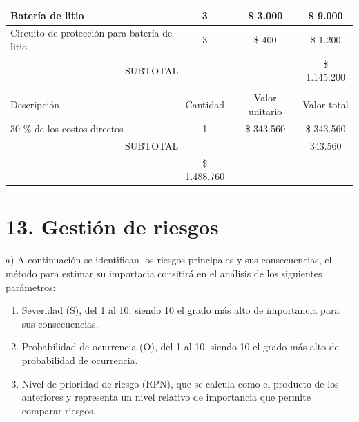 \documentclass[
11pt, %
codirector, %
]{charter}
\begin{document}
\begin{table}[htpb]
\begin{tabularx}{\linewidth}{@{}|X|c|r|r|@{}}
Batería de litio &
  \multicolumn{1}{c|}{3} &
  \multicolumn{1}{c|}{\$ 3.000} &
  \multicolumn{1}{c|}{\$ 9.000} \\ \hline
  
Circuito de protección para batería de litio &
  \multicolumn{1}{c|}{3} &
  \multicolumn{1}{c|}{\$ 400} &
  \multicolumn{1}{c|}{\$ 1.200} \\ \hline

\multicolumn{3}{|c|}{SUBTOTAL} &
  \multicolumn{1}{c|}{\$ 1.145.200} \\ \hline
\rowcolor[HTML]{C0C0C0} 
\multicolumn{4}{|c|}{\cellcolor[HTML]{C0C0C0}COSTOS INDIRECTOS} \\ \hline
\rowcolor[HTML]{C0C0C0} 
Descripción &
  \multicolumn{1}{c|}{\cellcolor[HTML]{C0C0C0}Cantidad} &
  \multicolumn{1}{c|}{\cellcolor[HTML]{C0C0C0}Valor unitario} &
  \multicolumn{1}{c|}{\cellcolor[HTML]{C0C0C0}Valor total} \\ \hline
   
   30 \% de los costos directos   &
  \multicolumn{1}{c|}{1} &
  \multicolumn{1}{c|}{\$ 343.560} &
  \multicolumn{1}{c|}{\$ 343.560} \\ \hline

\multicolumn{3}{|c|}{SUBTOTAL} &
  \multicolumn{1}{c|}{343.560} \\ \hline
\rowcolor[HTML]{C0C0C0}
\multicolumn{3}{|c|}{TOTAL} & \$ 1.488.760
   \\ \hline
\end{tabularx}%
\end{table}


\section{13. Gestión de riesgos}
\label{sec:riesgos}


a) A continuación se identifican los riesgos principales y sus consecuencias, el método para estimar su importacia consitirá en el análisis de los siguientes parámetros:

\begin{enumerate}
\item Severidad (S), del 1 al 10, siendo 10 el grado más alto de importancia para sus consecuencias.
\item Probabilidad de ocurrencia (O), del 1 al 10, siendo 10 el grado más alto de probabilidad de ocurrencia.
\item Nivel de prioridad de riesgo (RPN), que se calcula como el producto de los anteriores y representa un nivel relativo de importancia que permite comparar riesgos.
\end{enumerate}
\end{document}
